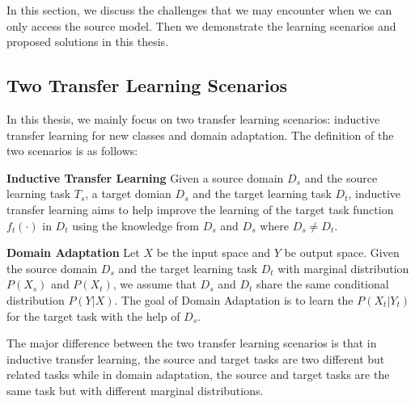In this section, we discuss the challenges that we may encounter when we can only access the source model. Then we demonstrate the learning scenarios and proposed solutions in this thesis.

\subsection{Two Transfer Learning Scenarios}
In this thesis, we mainly focus on two transfer learning scenarios: inductive transfer learning for new classes and domain adaptation. The definition of the two scenarios is as follows:
\begin{definition}{\textbf{Inductive Transfer Learning}}\cite{pan2010survey}
	Given a source domain $D_s$ and the source learning task $T_s$, a target domian $D_s$ and the target learning task $D_t$, inductive transfer learning aims to help improve the learning of the target task function $f_t(\cdot)$ in $D_t$ using the knowledge from $D_s$ and $D_s$ where $D_s \neq D_t$.
\end{definition}
\begin{definition}{\textbf{Domain Adaptation}}
	Let $X$ be the input space and $Y$ be output space. Given the source domain $D_s$ and the target learning task $D_t$ with marginal distribution $P(X_s)$ and $P(X_t)$, we assume that $D_s$ and $D_t$ share the same conditional distribution $P(Y|X)$. The goal of Domain Adaptation is to learn the $P(X_t|Y_t)$ for the target task with the help of $D_s$.
\end{definition}
The major difference between the two transfer learning scenarios is that in inductive transfer learning, the source and target tasks are two different but related tasks while in domain adaptation, the source and target tasks are the same task but with different marginal distributions. 

